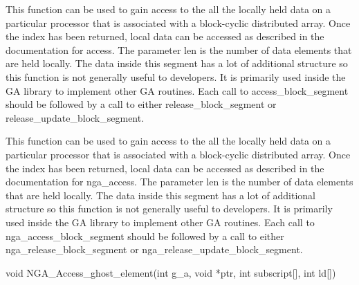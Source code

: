 \documentclass[12pt]{article}
\begin{document}
\begin{pydesc}
This function can be used to gain access to the all the locally held data on a
particular processor that is associated with a block-cyclic distributed array.
Once the index has been returned, local data can be accessed as described in
the documentation for access. The parameter len is the number of data
elements that are held locally. The data inside this segment has a lot of
additional structure so this function is not generally useful to developers. It
is primarily used inside the GA library to implement other GA routines. Each
call to access_block_segment should be followed by a call to either
release_block_segment or release_update_block_segment.
\end{pydesc}

\begin{fdesc}
This function can be used to gain access to the all the locally held data on a
particular processor that is associated with a block-cyclic distributed array.
Once the index has been returned, local data can be accessed as described in
the documentation for nga_access. The parameter len is the number of data
elements that are held locally. The data inside this segment has a lot of
additional structure so this function is not generally useful to developers. It
is primarily used inside the GA library to implement other GA routines. Each
call to nga_access_block_segment should be followed by a call to either
nga_release_block_segment or nga_release_update_block_segment.
\end{fdesc}



\begin{capi}
\begin{ccode}
void NGA_Access_ghost_element(int g_a, void *ptr, int subscript[],
                              int ld[])
\end{ccode}
\begin{funcargs}
\end{funcargs}
\end{capi}
\end{document}
